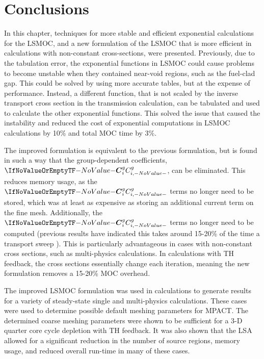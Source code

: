 {  \section{Conclusions}{\label{sec:LSMOC:Conclusions}
    In this chapter, techniques for more stable and efficient exponential calculations for the \ac{LSMOC}, and a new formulation of the \ac{LSMOC} that is more efficient in calculations with non-constant cross-sections, were presented.
    Previously, due to the tabulation error, the exponential functions in \ac{LSMOC} could cause problems to become unstable when they contained near-void regions, such as the fuel-clad gap.
    This could be solved by using more accurate tables, but at the expense of performance.
    Instead, a different function, that is not scaled by the inverse transport cross section in the transmission calculation, can be tabulated and used to calculate the other exponential functions.
    This solved the issue that caused the instability and reduced the cost of exponential computations in \ac{LSMOC} calculations by 10\% and total \ac{MOC} time by 3\%.

    The improved formulation is equivalent to the previous formulation, but is found in such a way that the group-dependent coefficients, $\C$, can be eliminated.
    This reduces memory usage, as the $\C$ terms no longer need to be stored, which was at least as expensive as storing an additional current term on the fine mesh.
    Additionally, the $\C$ terms no longer need to be computed (previous results have indicated this takes around 15-20\% of the time a transport sweep \cite{Fitzgerald2019}).
    This is particularly advantageous in cases with non-constant cross sections, such as multi-physics calculations.
    In calculations with \ac{TH} feedback, the cross sections essentially change each iteration, meaning the new formulation removes a 15-20\% \ac{MOC} overhead.

    The improved \ac{LSMOC} formulation was used in calculations to generate results for a variety of steady-state single and multi-physics calculations.
    These cases were used to determine possible default meshing parameters for MPACT.
    The determined coarse meshing parameters were shown to be sufficient for a 3-D quarter core cycle depletion with \ac{TH} feedback.
    It was also shown that the \ac{LSA} allowed for a significant reduction in the number of source regions, memory usage, and reduced overall run-time in many of these cases.

}}
